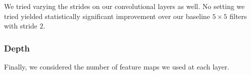 \documentclass{article}
\begin{document}
\begin{multicols}{2}
We tried varying the strides on our convolutional layers as well.
No setting we tried yielded statistically significant improvement
over our baseline $5\times 5$ filters with stride $2$.


\subsubsection{Depth}

Finally, we considered the number of feature maps
we used at each layer.













\end{multicols}
\end{document}
